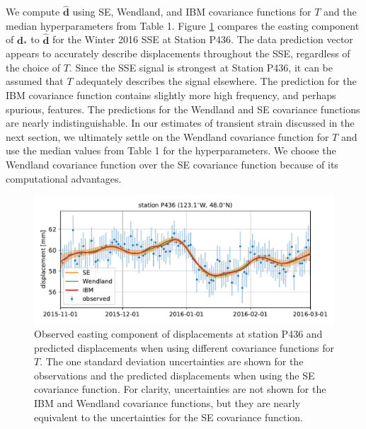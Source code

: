 \documentclass[10pt,letter]{article}
\begin{document}
We compute $\hat{\bm{d}}$ using SE, Wendland, and IBM covariance functions for $T$ and the median hyperparameters from Table 1. Figure \ref{fig:Fit} compares the easting component of $\bm{d}_*$ to $\hat{\bm{d}}$ for the Winter 2016 SSE at Station P436. The data prediction vector appears to accurately describe displacements throughout the SSE, regardless of the choice of $T$. Since the SSE signal is strongest at Station P436, it can be assumed that $T$ adequately describes the signal elsewhere. The prediction for the IBM covariance function contains slightly more high frequency, and perhaps spurious, features. The predictions for the Wendland and SE covariance functions are nearly indistinguishable. In our estimates of transient strain discussed in the next section, we ultimately settle on the Wendland covariance function for $T$ and use the median values from Table 1 for the hyperparameters. We choose the Wendland covariance function over the SE covariance function because of its computational advantages.     

\begin{figure}
\includegraphics{figures/signal_fit/signal-fit.pdf}
\caption{Observed easting component of displacements at station P436 and predicted displacements when using different covariance functions for $T$. The one standard deviation uncertainties are shown for the observations and the predicted displacements when using the SE covariance function. For clarity, uncertainties are not shown for the IBM and Wendland covariance functions, but they are nearly equivalent to the uncertainties for the SE covariance function.}   
\label{fig:Fit}
\end{figure}
\end{document}
